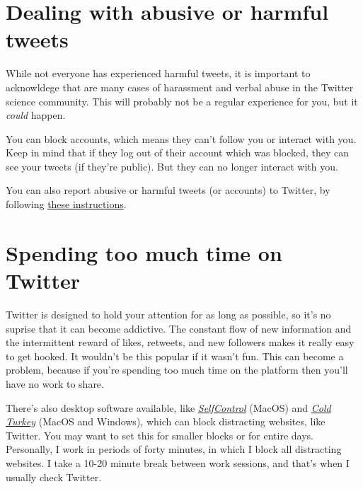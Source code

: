 \documentclass[]{book}
\begin{document}
\hypertarget{dealing-with-abusive-or-harmful-tweets}{%
\section{Dealing with abusive or harmful tweets}\label{dealing-with-abusive-or-harmful-tweets}}

While not everyone has experienced harmful tweets, it is important to acknowldege that are many cases of harassment and verbal abuse in the Twitter science community. This will probably not be a regular experience for you, but it \emph{could} happen.

You can block accounts, which means they can't follow you or interact with you. Keep in mind that if they log out of their account which was blocked, they can see your tweets (if they're public). But they can no longer interact with you.

You can also report abusive or harmful tweets (or accounts) to Twitter, by following \href{https://help.twitter.com/en/safety-and-security/report-abusive-behavior}{these instructions}.

\hypertarget{spending-too-much-time-on-twitter}{%
\section{Spending too much time on Twitter}\label{spending-too-much-time-on-twitter}}

Twitter is designed to hold your attention for as long as possible, so it's no suprise that it can become addictive. The constant flow of new information and the intermittent reward of likes, retweets, and new followers makes it really easy to get hooked. It wouldn't be this popular if it wasn't fun. This can become a problem, because if you're spending too much time on the platform then you'll have no work to share.

There's also desktop software available, like \href{https://selfcontrolapp.com/}{\emph{SelfControl}} (MacOS) and \href{https://getcoldturkey.com/pricing/}{\emph{Cold Turkey}} (MacOS and Windows), which can block distracting websites, like Twitter. You may want to set this for smaller blocks or for entire days. Personally, I work in periods of forty minutes, in which I block all distracting websites. I take a 10-20 minute break between work sessions, and that's when I usually check Twitter.


\end{document}
